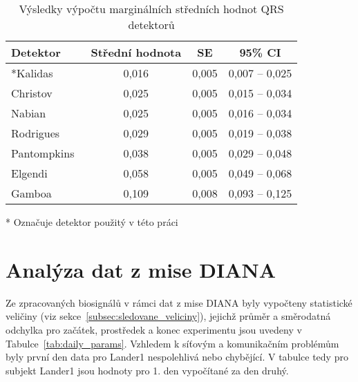 \begin{table}[!htb]
    \small
    \centering
    \caption{Výsledky výpočtu marginálních středních hodnot QRS detektorů}
    \setlength\tabcolsep{0pt}
    \begin{threeparttable}
        \begin{tabular*}{\linewidth}{@{\extracolsep{\fill}} lccc @{}}
            \toprule
            Detektor                        & Střední hodnota & SE    & 95\% CI      \\ \midrule
            *Kalidas~\cite{kalidas2017}     & 0,016           & 0,005 & 0,007 -- 0,025 \\
            Christov~\cite{Christov2004}    & 0,025           & 0,005 & 0,015 -- 0,034 \\
            Nabian~\cite{Nabian2018}        & 0,025           & 0,005 & 0,016 -- 0,034 \\
            Rodrigues~\cite{Rodrigues2021}  & 0,029           & 0,005 & 0,019 -- 0,038 \\
            Pantompkins~\cite{Tompkins1985} & 0,038           & 0,005 & 0,029 -- 0,048 \\
            Elgendi~\cite{Elgendi2010}      & 0,058           & 0,005 & 0,049 -- 0,068 \\
            Gamboa~\cite{gamboa2008}        & 0,109           & 0,008 & 0,093 -- 0,125 \\
            \bottomrule
        \end{tabular*}
        \begin{tablenotes}
            \item [*] Označuje detektor použitý v této práci
        \end{tablenotes}
    \end{threeparttable}
    \label{tab:qrs}
\end{table}

\section{Analýza dat z mise DIANA}
\label{sec:vysledky_vizual}
Ze zpracovaných biosignálů v rámci dat z mise DIANA byly vypočteny statistické
veličiny (viz sekce~\ref{subsec:sledovane_veliciny}), jejichž průměr a
směrodatná odchylka pro začátek, prostředek a konec experimentu jsou uvedeny v
Tabulce~\ref{tab:daily_params}. Vzhledem k síťovým a komunikačním problémům byly
první den data pro Lander1 nespolehlivá nebo chybějící. V tabulce tedy pro
subjekt Lander1 jsou hodnoty pro 1. den vypočítané za den druhý.


